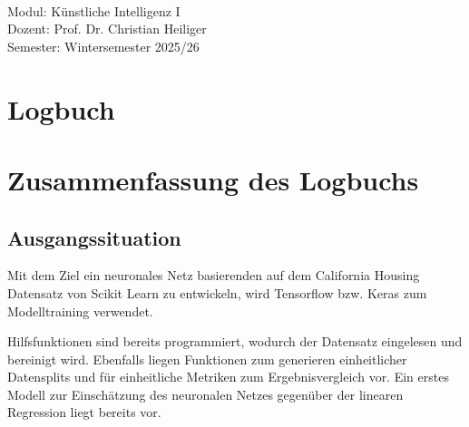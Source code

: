 \documentclass[12pt,a4paper,ngerman,openany]{report}
\begin{document}
\begin{titlepage}
\begin{minipage}{0.5\textwidth}
\begin{flushright}
        \end{flushright}
    \end{minipage}\\[2.0 cm]

        
    \begin{minipage}{0.8\textwidth}
       \begin{center}
        \large
        Modul: Künstliche Intelligenz I\\
        Dozent: Prof. Dr. Christian Heiliger\\
        Semester: Wintersemester 2025/26
        \end{center} 
    \end{minipage}

\vfill

\end{titlepage}

\setcounter{secnumdepth}{3} 
\setcounter{tocdepth}{4}
\cleardoublepage
\tableofcontents
\cleardoublepage



\renewcommand{\thesection}{\arabic{section}}

\newpage

\section{Logbuch}




\newpage
\section{Zusammenfassung des Logbuchs}
\subsection{Ausgangssituation}
Mit dem Ziel ein neuronales Netz basierenden auf dem California Housing Datensatz von Scikit Learn zu entwickeln, wird Tensorflow bzw. Keras zum Modelltraining verwendet.

Hilfsfunktionen sind bereits programmiert, wodurch der Datensatz eingelesen und bereinigt wird. Ebenfalls liegen Funktionen zum generieren einheitlicher Datensplits und für einheitliche Metriken zum Ergebnisvergleich vor. Ein erstes Modell zur Einschätzung des neuronalen Netzes gegenüber der linearen Regression liegt bereits vor. \parencite{florians_code}
\end{document}
